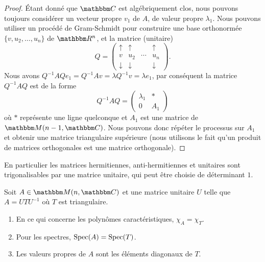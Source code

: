 \begin{proof}
    Étant donné que \( \eC\) est algébriquement clos, nous pouvons toujours considérer un vecteur propre \( v_1\) de \( A\), de valeur propre \( \lambda_1\). Nous pouvons utiliser un procédé de Gram-Schmidt pour construire une base orthonormée \( \{ v,u_2,\ldots, u_n \}\) de \( \eR^n\), et la matrice (unitaire)
    \begin{equation}
        Q=\begin{pmatrix}
             \uparrow   &   \uparrow    &       &   \uparrow    \\
             v   &   u_2    &   \cdots    &   u_n    \\
             \downarrow   &   \downarrow    &       &   \downarrow
         \end{pmatrix}.
    \end{equation}
    Nous avons \( Q^{-1}AQe_1=Q^{-1} Av=\lambda Q^{-1} v=\lambda e_1\), par conséquent la matrice \( Q^{-1} AQ\) est de la forme
    \begin{equation}
        Q^{-1}AQ=\begin{pmatrix}
            \lambda_1    &   *    \\
            0    &   A_1
        \end{pmatrix}
    \end{equation}
    où \( *\) représente une ligne quelconque et \( A_1\) est une matrice de \( \eM(n-1,\eC)\). Nous pouvons donc répéter le processus sur \( A_1\) et obtenir une matrice triangulaire supérieure (nous utilisons le fait qu'un produit de matrices orthogonales est une matrice orthogonale).
\end{proof}
En particulier les matrices hermitiennes, anti-hermitiennes et unitaires sont trigonalisables par une matrice unitaire, qui peut être choisie de déterminant \( 1\).

\begin{lemma}       \label{LEMooRCFGooPPXiKi}
    Soit \( A\in \eM(n,\eC)\) et une matrice unitaire \( U\) telle que \( A=UTU^{-1}\) où \( T\) est triangulaire.
    \begin{enumerate}
        \item
            En ce qui concerne les polynômes caractéristiques, \( \chi_A=\chi_T\).
        \item
            Pour les spectres, \( \operatorname{Spec}(A)=\operatorname{Spec}(T)\).
        \item
            Les valeurs propres de \( A\) sont les éléments diagonaux de \( T\).
    \end{enumerate}
\end{lemma}

